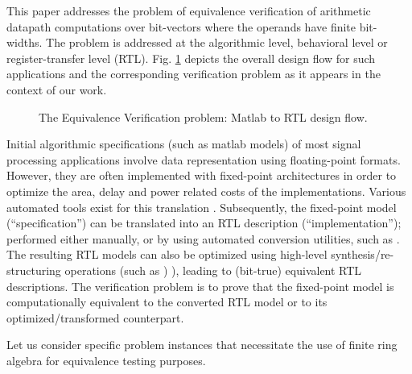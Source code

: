 This paper addresses the problem of equivalence verification of
arithmetic datapath computations over bit-vectors where the operands
have finite bit-widths. The problem is addressed at the algorithmic
level, behavioral level or register-transfer level
(RTL). Fig. \ref{fig:matlab} depicts the overall design flow for such
applications and the corresponding verification problem as it appears
in the context of our work.

\begin{figure}[htb]
\epsfysize=5cm
\centerline{}
\caption{The Equivalence Verification problem: Matlab to RTL design flow.}
\label{fig:matlab}
\end{figure}

Initial algorithmic specifications (such as {\sc matlab} models) of
most signal processing applications involve data representation using
floating-point formats.  However, they are often implemented with
fixed-point architectures in order to optimize the area, delay and
power related costs of the implementations. Various automated tools
exist for this translation \cite{float-to-fixed:cases02}.
Subsequently, the fixed-point model (``specification'') can be
translated into an RTL description (``implementation''); performed
either manually, or by using automated conversion utilities, such as
\cite{mvhdl} \cite{matlab}. The resulting RTL models can also be
optimized using high-level synthesis/re-structuring operations (such
as \cite{demicheli:tcad_03} \cite{fallah-poly-factor})
\cite{sivaram:iwls06}), leading to (bit-true) equivalent RTL
descriptions. The verification problem is to prove that the
fixed-point model is computationally equivalent to the converted RTL
model or to its optimized/transformed counterpart.

Let us consider specific problem instances that necessitate the use of
finite ring algebra for equivalence testing purposes.

